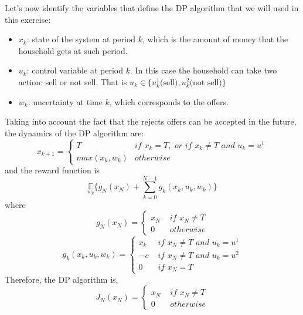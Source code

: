 \documentclass[11pt, oneside]{article}   	%
\begin{document}
Let's now identify the variables that define the DP algorithm that we will used in this exercise:
\begin{itemize}
	\item $x_{k}$: state of the system at period $k$, which is the amount of money that the household gets at such period.
	\item $u_{k}$: control variable at period $k$. In this case the household can take two action: sell or not sell. That is $u_{k} \in \{u_{k}^{1}\text{(sell)}, u_{k}^{2}\text{(not sell)}\}$
	\item $w_{k}$: uncertainty at time $k$, which corresponds to the offers.
\end{itemize}
Taking into account the fact that the rejects offers can be accepted in the future, the dynamics of the DP algorithm are:
$$x_{k+1} = \begin{cases}
T & if \, \, x_{k}=T, \, \, or \, \, if \, \, x_{k} \neq T \, \, and \, \, u_{k}=u^{1}\\
max(x_{k},w_{k}) & otherwise
\end{cases}$$
and the reward function is
$$\underset{w_{k}}{\mathbb{E}} \bigg\{g_{N}(x_{N}) + \sum_{k=0}^{N-1} g_{k}(x_{k},u_{k},w_{k})\bigg\}$$
where
$$g_{N}(x_{N}) = \begin{cases}
				x_{N} \, \, & if \, \, x_{N} \neq T\\
				0 \, \,  & otherwise
			   \end{cases}
$$
$$g_{k}(x_{k},u_{k},w_{k}) = \begin{cases}
						x_{k} \, \, & if \, \, x_{N} \neq T \, \, and \, \, u_{k} = u^{1}\\
						-c \, \, & if \, \, x_{N} \neq T \, \, and \, \, u_{k} = u^{2}\\
				0 \, \,  &  if \, \, x_{N} = T
			   \end{cases}
$$
Therefore, the DP algorithm is,
$$J_{N}(x_{N}) = \begin{cases}
				x_{N} \, \, & if \, \, x_{N} \neq T\\
				0 \, \,  & otherwise
			   \end{cases}
$$
\end{document}
